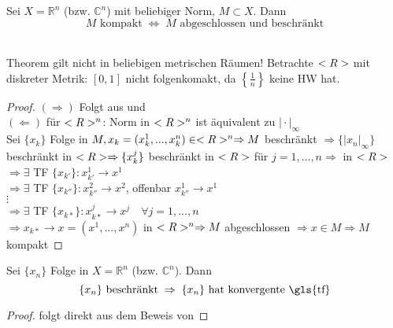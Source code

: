 \begin{theorem}
	Sei $X=\mathbb{R}^n$ (bzw. $\mathbb{C}^n$) mit beliebiger Norm, $M\subset X$. Dann \[ M \text{ kompakt} \;\Leftrightarrow\; M \text{ abgeschlossen und beschränkt} \] \\
	
	\begin{boldenvironment}[Warnung]
		Theorem gilt nicht in beliebigen metrischen Räumen! Betrachte $<R>$ mit diskreter Metrik: $[0,1]$ nicht folgenkomakt, da $\left\lbrace \frac{1}{n}\right\rbrace$ keine HW hat.
	\end{boldenvironment}
\end{theorem}
\begin{proof}
	$(\Rightarrow)$ Folgt aus  und  \\
	$(\Leftarrow)$ für $<R>^n$: Norm in $<R>^n$ ist äquivalent zu $\vert\cdot\vert_\infty$ \\
	Sei $\{x_k\}$ Folge in $M, x_k=(x^1_k,...,x^n_k)\in <R>^n\Rightarrow M$ beschränkt $\Rightarrow \{\vert x_n\vert_\infty\}$ beschränkt in $<R>\Rightarrow \{x^j_k\}$ beschränkt in $<R>$ für $j=1,...,n\Rightarrow$  in $<R>$ \\
	$\Rightarrow\exists$ TF $\{x_{k'}\}:x^1_{k'}\to x^1$ \\
	$\Rightarrow\exists$ TF $\{x_{k''}\}:x^2_{k''}\to x^2$, offenbar $x^1_{k''}\to x^1$ \\
	$\vdots$ \\
	$\Rightarrow\exists$ TF $\{x_{k*}\}:x^j_{k*}\to x^j\quad\forall j=1,...,n$ \\
	$\Rightarrow x_{k*}\to x=(x^1,...,x^n)$ in $<R>^n\Rightarrow M$ abgeschlossen $\Rightarrow x\in M\Rightarrow M$ kompakt
\end{proof}

\begin{conclusion}
	Sei $\{x_n\}$ Folge in $X=\mathbb{R}^n$ (bzw. $\mathbb{C}^n$). Dann \[ \{x_n\}\text{ beschränkt} \;\Rightarrow \; \{x_n\} \text{ hat konvergente \gls{tf}}\]
\end{conclusion}
\begin{proof}
	folgt direkt aus dem Beweis von 
\end{proof}

